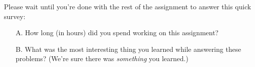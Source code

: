\documentclass[12pt,letterpaper,boxed,cm]{hmcpset}
\begin{document}
\begin{solution}
    \vfill
\end{solution}
\newpage

\begin{problem} Please wait until you're done with the rest of the assignment to answer this quick survey:
    \begin{enumerate}
        \item [A.] How long (in hours) did you spend working on this assignment?
        \item [B.] What was the most interesting thing you learned while answering these problems? (We're sure there was \textit{something} you learned.)
    \end{enumerate}
\end{problem}

\begin{solution}
    \vfill
\end{solution}
\newpage
\end{document}
